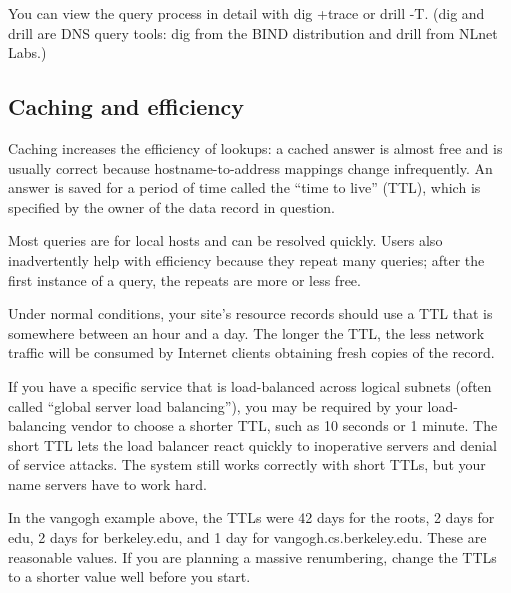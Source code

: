 You can view the query process in detail with {dig +trace} or {drill
-T}. ({dig} and {drill} are DNS query tools: {dig} from the BIND
distribution and {drill} from NLnet Labs.)

\protect\hypertarget{part0024_split_016.html}{}{}

\hypertarget{part0024_split_016.htmlux5cux23_idContainer1069}{}
\hypertarget{part0024_split_016.htmlux5cux23calibre_pb_15}{%
\subsection[Caching and
efficiency]{\texorpdfstring{\protect\hypertarget{part0024_split_016.htmlux5cux23_idTextAnchor861}{}{}Caching
and
efficiency}{Caching and efficiency}}\label{part0024_split_016.htmlux5cux23calibre_pb_15}}

\protect\hypertarget{part0024_split_016.htmlux5cux23_idIndexMarker2038}{}{}\protect\hypertarget{part0024_split_016.htmlux5cux23_idIndexMarker2039}{}{}Caching
increases the efficiency of lookups: a cached answer is almost free and
is usually correct because hostname-to-address mappings change
infrequently. An answer is saved for a period of time called the
``\protect\hypertarget{part0024_split_016.htmlux5cux23_idIndexMarker2040}{}{}\protect\hypertarget{part0024_split_016.htmlux5cux23_idIndexMarker2041}{}{}time
to live'' (TTL), which is specified by the owner of the data record in
question.

Most queries are for local hosts and can be resolved quickly. Users also
inadvertently help with efficiency because they repeat many queries;
after the first instance of a query, the repeats are more or less free.

Under normal conditions, your site's resource records should use a TTL
that is somewhere between an hour and a day. The longer the TTL, the
less network traffic will be consumed by Internet clients obtaining
fresh copies of the record.

If you have a specific service that is load-balanced across logical
subnets (often called ``global server load balancing''), you may be
required by your load-balancing vendor to choose a shorter TTL, such as
10 seconds or 1 minute. The short TTL lets the load balancer react
quickly to inoperative servers and
\protect\hypertarget{part0024_split_016.htmlux5cux23_idIndexMarker2042}{}{}denial
of service attacks. The system still works correctly with short TTLs,
but your name servers have to work hard.

In the vangogh example above, the TTLs were 42 days for the roots, 2
days for edu, 2 days for berkeley.edu, and 1 day for
vangogh.cs.berkeley.edu. These are reasonable values. If you are
planning a massive renumbering, change the TTLs to a shorter value well
before you start.

